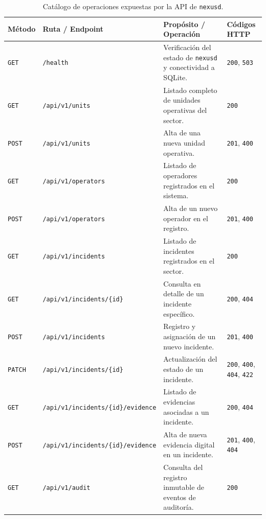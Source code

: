 \documentclass[10pt,a4paper]{article}
\begin{document}
\begin{table}[H]
    \centering
    \footnotesize
    \caption{Catálogo de operaciones expuestas por la API de \texttt{nexusd}.}
    \label{tab:api_endpoints}
    \begin{tabularx}{\textwidth}{llXl}
        \toprule
        \rowcolor{tableheader}
        \textbf{Método} & \textbf{Ruta / Endpoint} & \textbf{Propósito / Operación} & \textbf{Códigos HTTP} \\
        \midrule
        \texttt{GET} & \texttt{/health} & Verificación del estado de \texttt{nexusd} y conectividad a SQLite. & \texttt{200}, \texttt{503} \\
        \rowcolor{rowalt}
        \texttt{GET} & \texttt{/api/v1/units} & Listado completo de unidades operativas del sector. & \texttt{200} \\
        \texttt{POST} & \texttt{/api/v1/units} & Alta de una nueva unidad operativa. & \texttt{201}, \texttt{400} \\
        \rowcolor{rowalt}
        \texttt{GET} & \texttt{/api/v1/operators} & Listado de operadores registrados en el sistema. & \texttt{200} \\
        \texttt{POST} & \texttt{/api/v1/operators} & Alta de un nuevo operador en el registro. & \texttt{201}, \texttt{400} \\
        \rowcolor{rowalt}
        \texttt{GET} & \texttt{/api/v1/incidents} & Listado de incidentes registrados en el sector. & \texttt{200} \\
        \texttt{GET} & \texttt{/api/v1/incidents/\{id\}} & Consulta en detalle de un incidente específico. & \texttt{200}, \texttt{404} \\
        \rowcolor{rowalt}
        \texttt{POST} & \texttt{/api/v1/incidents} & Registro y asignación de un nuevo incidente. & \texttt{201}, \texttt{400} \\
        \texttt{PATCH} & \texttt{/api/v1/incidents/\{id\}} & Actualización del estado de un incidente. & \texttt{200}, \texttt{400}, \texttt{404}, \texttt{422} \\
        \rowcolor{rowalt}
        \texttt{GET} & \texttt{/api/v1/incidents/\{id\}/evidence} & Listado de evidencias asociadas a un incidente. & \texttt{200}, \texttt{404} \\
        \texttt{POST} & \texttt{/api/v1/incidents/\{id\}/evidence} & Alta de nueva evidencia digital en un incidente. & \texttt{201}, \texttt{400}, \texttt{404} \\
        \rowcolor{rowalt}
        \texttt{GET} & \texttt{/api/v1/audit} & Consulta del registro inmutable de eventos de auditoría. & \texttt{200} \\
        \bottomrule
    \end{tabularx}
\end{table}
\end{document}
